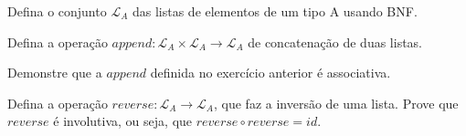 \begin{exercise}
\label{lists-def}
Defina o conjunto $\mathcal{L}_A$ das listas de elementos de um tipo A usando BNF.
\end{exercise}

\begin{exercise}
Defina a operação $append: \mathcal{L}_A \times \mathcal{L}_A \to \mathcal{L}_A$ de concatenação de duas listas. 
\end{exercise}

\begin{exercise}
Demonstre que a $append$ definida no exercício anterior é associativa.
\end{exercise}

\begin{homework}
Defina a operação $reverse: \mathcal{L}_A \to \mathcal{L}_A$, que faz a inversão de uma lista. Prove que $reverse$ é involutiva, ou seja, que $reverse \circ reverse = id$.
\end{homework}

